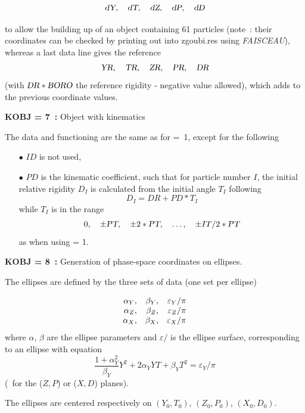 $$ \textsl{dY},\quad \textsl{dT},\quad \textsl{dZ},\quad \textsl{dP},  \quad \textsl{dD} $$
 
 \noindent to allow the building up of an object containing 61 particles (note~: their coordinates can be 
checked by printing out into zgoubi.res using \textsl{FAISCEAU}), whereas   a last data line gives  the reference 
$$\textsl{YR}, \quad \textsl{TR}, \quad \textsl{ZR}, \quad \textsl{PR}, \quad \textsl{DR} $$
(with $ \textsl{DR}\ast \textsl{BORO}$  the reference rigidity - negative value allowed), which adds to the previous 
 coordinate values.


\bigskip


\noindent\textbf{KOBJ = 7~:} Object with kinematics 

\noindent The data and functioning are the same as for \mbox{\KOBJ= 1}, except for the 
following  
\begin{itemize}
\item[$\bullet$]  $ ID $ is not used,  
\item[$\bullet$]  $ PD $ is the kinematic coefficient, such that for particle
number $ I$,  the initial relative rigidity $ D_I $ is calculated from the initial angle 
$T_I $ following
$$ D_I = DR+ PD \ast  T_I $$
\noindent  while $ T_I $ is in the range
$$ 0,\quad \pm \textsl{PT},\quad \pm 2\ast \textsl{PT},\quad \ldots,\quad \pm IT/2\ast \textsl{PT} $$
\noindent as when using \KOBJ = 1. 
\end{itemize}

\bigskip


\noindent\textbf{KOBJ = 8~:} Generation of phase-space coordinates on ellipses. 

\noindent The ellipses are defined by  the three sets of data (one set per 
  ellipse) 

$$
\begin{array}{*{2}{r<{,}}r}
 \alpha_ Y  &   \beta_ Y  
            &  \varepsilon_Y / \pi \\
\alpha_ Z   &  \beta_ Z  
            &  \varepsilon_Z / \pi \\
\alpha_ X   & \beta_ X 
            &  \varepsilon_X / \pi 
\end{array}           
$$            
%
where $\alpha$, $\beta$ are the ellipse parameters  and $\varepsilon/$ is the 
ellipse surface, corresponding to an ellipse with equation 
$$\dfrac{1 + \alpha^2_Y}{\beta_Y} Y^2 + 2 \alpha_Y YT + \beta_Y T^2 = \varepsilon_Y / \pi$$ 
\noindent (\id\ for the ($Z, P$) or ($X, D$) planes). 

\medskip

\noindent The ellipses are centered respectively on $(Y_0, T_0)$, $(Z_0, P_0)$, $(X_0, D_0)$.  

